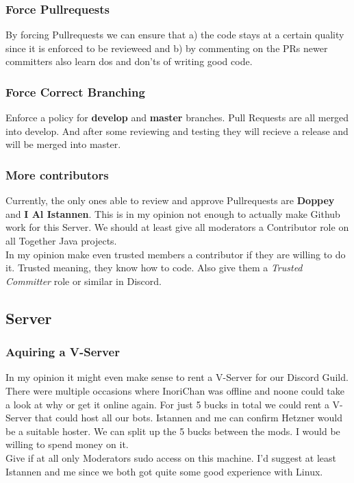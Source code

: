 \documentclass{article}
\begin{document}
    \subsubsection{Force Pullrequests}
    \label{sec:forcepullrequests}
    By forcing Pullrequests we can ensure that a) the code stays at a certain quality since it is enforced to be revieweed and 
    b) by commenting on the PRs newer committers also learn dos and don'ts of writing good code.

    \subsubsection{Force Correct Branching}
    \label{sec:forcecorrectbranching}
    Enforce a policy for \textbf{develop} and \textbf{master} branches. Pull Requests are all merged into develop. 
    And after some reviewing and testing they will recieve a release and will be merged into master.

    \subsubsection{More contributors}
    Currently, the only ones able to review and approve Pullrequests are \textbf{Doppey} and \textbf{I Al Istannen}. 
    This is in my opinion not enough to actually make Github work for this Server. 
    We should at least give all moderators a Contributor role on all Together Java projects. \\
    In my opinion make even trusted members a contributor if they are willing to do it. 
    Trusted meaning, they know how to code. Also give them a \textit{Trusted Committer} role or similar in Discord.

    \subsection{Server}

    \subsubsection{Aquiring a V-Server}
    \label{sec:vserver}
    In my opinion it might even make sense to rent a V-Server for our Discord Guild. 
    There were multiple occasions where InoriChan was offline and noone could take a look at why or get it online again.
    For just 5 bucks in total we could rent a V-Server that could host all our bots. Istannen and me can confirm Hetzner would be a suitable hoster.
    We can split up the 5 bucks between the mods. I would be willing to spend money on it. \\
    Give if at all only Moderators sudo access on this machine. I'd suggest at least Istannen and me since we both got quite some good experience with Linux.
\end{document}
